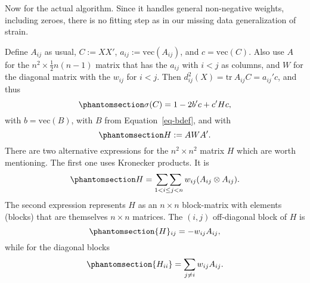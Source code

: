 \documentclass[
  12pt,
  letterpaper,
  DIV=11,
  numbers=noendperiod]{scrartcl}
\begin{document}
Now for the actual algorithm. Since it handles general non-negative
weights, including zeroes, there is no fitting step as in our missing
data generalization of strain.

Define \(A_{ij}\) as usual, \(C:=XX'\), \(a_{ij}:=\text{vec}(A_{ij})\),
and \(c=\text{vec}(C)\). Also use \(A\) for the
\(n^2\times\frac12n(n-1)\) matrix that has the \(a_{ij}\) with \(i<j\)
as columns, and \(W\) for the diagonal matrix with the \(w_{ij}\) for
\(i<j\). Then \(d_{ij}^2(X)=\text{tr}\ A_{ij}C=a_{ij}'c\), and thus
\begin{equation}\phantomsection\label{eq-elegantc}{
\sigma(C)=1-2b'c+c'Hc,
}\end{equation} with \(b=\text{vec}(B)\), with \(B\) from
Equation~\ref{eq-bdef}, and with
\begin{equation}\phantomsection\label{eq-hdef}{
H:=AWA'.
}\end{equation} There are two alternative expressions for the
\(n^2\times n^2\) matrix \(H\) which are worth mentioning. The first one
uses Kronecker products. It is
\begin{equation}\phantomsection\label{eq-halt1}{
H=\mathop{\sum\sum}_{1<i\leq j<n} w_{ij}(A_{ij}\otimes A_{ij}).
}\end{equation} The second expression represents \(H\) as an
\(n\times n\) block-matrix with elements (blocks) that are themselves
\(n\times n\) matrices. The \((i, j)\) off-diagonal block of \(H\) is
\begin{equation}\phantomsection\label{eq-halt2}{
\{H\}_{ij}=-w_{ij}A_{ij},
}\end{equation} while for the diagonal blocks
\begin{equation}\phantomsection\label{eq-halt3}{
\{H_{ii}\}=\sum_{j\not= i} w_{ij}A_{ij}.
}\end{equation}
\end{document}
